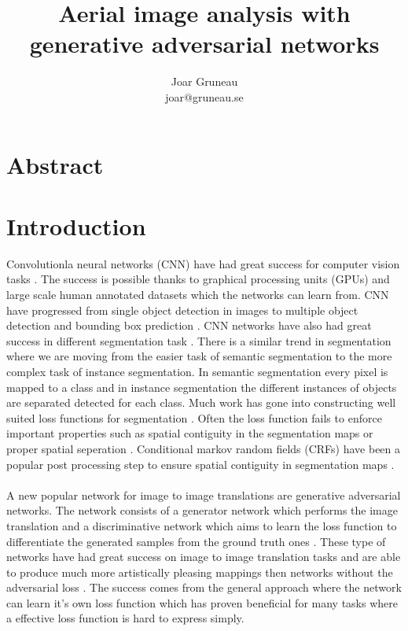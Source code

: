 \documentclass[a4paper,11pt]{article}
\title{Aerial image analysis with generative adversarial networks}
\author{Joar Gruneau \\ joar@gruneau.se}
\affil{}
\begin{document}
\maketitle
\newpage
\tableofcontents
\newpage
\section{Abstract}
\section{Introduction}
Convolutionla neural networks (CNN) have had great success for computer vision tasks \cite{sermanet_overfeat:_2013, zeiler_visualizing_2013, simonyan_two-stream_2014, krizhevsky_imagenet_2012}. The success is possible thanks to graphical processing units (GPUs) and large scale human annotated datasets which  the networks can learn from. CNN have progressed from single object detection in images \cite{krizhevsky_learning_2009} to multiple object detection and bounding box prediction \cite{lin_microsoft_2014}. CNN networks have also had great success in different segmentation task \cite{garcia-garcia_review_2017}. There is a similar trend in segmentation where we are moving from the easier task of semantic segmentation to the more complex task of instance segmentation. In semantic segmentation every pixel is mapped to a class and in instance segmentation the different instances of objects are separated detected for each class. Much work has gone into constructing well suited loss functions for segmentation \cite{ronneberger_u-net:_2015, yu_unitbox:_2016, rahman_optimizing_2016}. Often the loss function fails to enforce important properties such as spatial contiguity in the segmentation maps \cite{luc_semantic_2016} or proper spatial seperation \cite{audebert_segment-before-detect:_2017}. Conditional markov random fields (CRFs) have been a popular post processing step to ensure spatial contiguity in segmentation maps \cite{zhao_classification_2007}.\\
\\
A new popular network for image to image translations are generative adversarial networks. The network consists of a generator network which performs the image translation and a discriminative network which aims to learn the loss function to differentiate the generated samples from the ground truth ones \cite{goodfellow_nips_2016}. These type of networks have had great success on image to image translation tasks and are able to produce much more artistically pleasing mappings then networks without the adversarial loss \cite{ledig_photo-realistic_2016, isola_image--image_2016}. The success comes from the general approach where the network can learn it's own loss function which has proven beneficial for many tasks where a effective loss function is hard to express simply.\\
\end{document}
